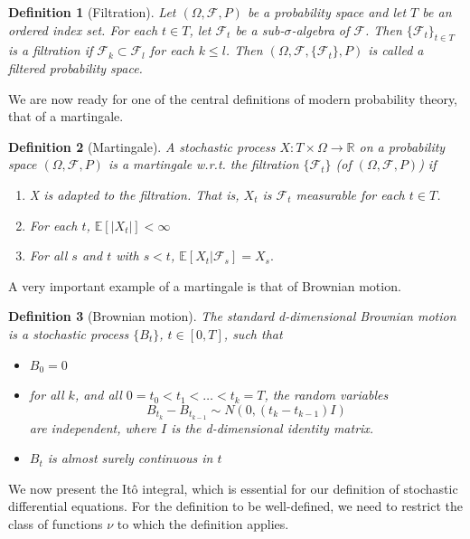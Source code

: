 \documentclass[12pt]{article}
\theoremstyle{break}
\newtheorem{definition}{Definition}[section]
\begin{document}
\begin{definition}[Filtration]
	Let $(\Omega, \mathcal{F}, P)$ be a probability space and let $T$ be an ordered index set. For each $t \in T$, let $\mathcal{F}_t$ be a sub-$\sigma$-algebra of $\mathcal{F}$. Then $\{\mathcal{F}_t\}_{t \in T}$ is a filtration if $\mathcal{F}_k \subset \mathcal{F}_l$ for each $k \leq l$. Then $(\Omega, \mathcal{F}, \{\mathcal{F}_t\}, P)$ is called a filtered probability space.
\end{definition}

We are now ready for one of the central definitions of modern probability theory, that of a martingale.

\begin{definition}[Martingale]
	A stochastic process $X:T \times \Omega \to \mathbb{R}$ on a probability space $(\Omega, \mathcal{F}, P)$ is a martingale w.r.t. the filtration $\{\mathcal{F}_t\}$ (of $(\Omega, \mathcal{F}, P)$) if
	\begin{enumerate}
		\item
		X is adapted to the filtration. That is, $X_t$ is $\mathcal{F}_t$ measurable for each $t \in T$.
		\item
			For each $t$, $\mathbb{E}[|X_t|] < \infty$
		\item
			For all $s$ and $t$ with $s < t$, $\mathbb{E}[X_t|\mathcal{F}_s] = X_s.$
	\end{enumerate}
\end{definition}

A very important example of a martingale is that of Brownian motion.
	\begin{definition}[Brownian motion]
		The standard d-dimensional Brownian motion is a stochastic process $\{B_t\}$, $t \in [0, T]$, such that
		\begin{itemize}
			\item $B_0 = 0$
			\item for all $k$, and all $0 = t_0 < t_1 < \ldots < t_k = T$, the random variables \[B_{t_k} - B_{t_{k-1}} \sim N(0, (t_k - t_{k-1})I)\] are independent, where $I$ is the d-dimensional identity matrix.
			\item $B_t$ is almost surely continuous in $t$
		\end{itemize}
	\end{definition}


	We now present the Itô integral, which is essential for our definition of stochastic differential equations. For the definition to be well-defined, we need to restrict the class of functions $\nu$ to which the definition applies. 
\end{document}
